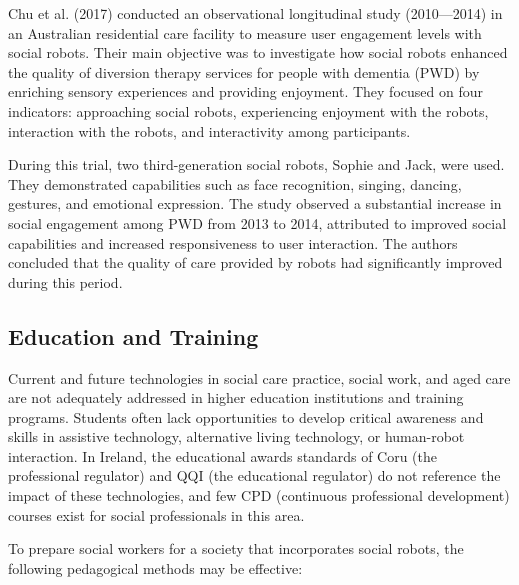 Chu et al. (2017) conducted an observational longitudinal study (2010—2014) in an Australian residential care facility to measure user engagement levels with social robots. Their main objective was to investigate how social robots enhanced the quality of diversion therapy services for people with dementia (PWD) by enriching sensory experiences and providing enjoyment. They focused on four indicators: approaching social robots, experiencing enjoyment with the robots, interaction with the robots, and interactivity among participants.

During this trial, two third-generation social robots, Sophie and Jack, were used. They demonstrated capabilities such as face recognition, singing, dancing, gestures, and emotional expression. The study observed a substantial increase in social engagement among PWD from 2013 to 2014, attributed to improved social capabilities and increased responsiveness to user interaction. The authors concluded that the quality of care provided by robots had significantly improved during this period.

\subsection{Education and Training}

Current and future technologies in social care practice, social work, and aged care are not adequately addressed in higher education institutions and training programs. Students often lack opportunities to develop critical awareness and skills in assistive technology, alternative living technology, or human-robot interaction. In Ireland, the educational awards standards of Coru (the professional regulator) and QQI (the educational regulator) do not reference the impact of these technologies, and few CPD (continuous professional development) courses exist for social professionals in this area.

To prepare social workers for a society that incorporates social robots, the following pedagogical methods may be effective:

